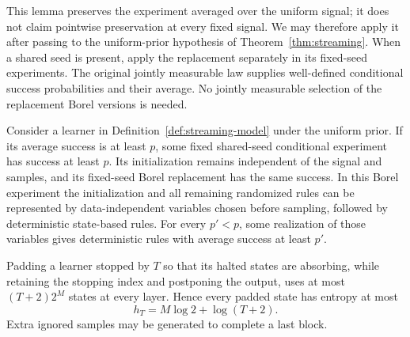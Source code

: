 This lemma preserves the experiment averaged over the uniform signal; it
does not claim pointwise preservation at every fixed signal. We may therefore
apply it after passing to the uniform-prior hypothesis of
Theorem~\ref{thm:streaming}.
When a shared seed is present, apply the replacement separately in its
fixed-seed experiments. The original jointly measurable law supplies
well-defined conditional success probabilities and their average. No
jointly measurable selection of the replacement Borel versions is needed.

\begin{lemma}\label{lem:padding}
Consider a learner in Definition~\ref{def:streaming-model} under the uniform
prior. If its average success is at least $p$, some fixed shared-seed
conditional experiment has success at least $p$. Its initialization remains
independent of the signal and samples, and its fixed-seed Borel replacement
has the same success. In this Borel experiment the initialization and all
remaining randomized rules can be represented by data-independent variables
chosen before sampling, followed by deterministic state-based rules. For
every $p'<p$, some realization of those variables gives deterministic rules
with average success at least $p'$.

Padding a learner stopped by $T$ so that its halted states are absorbing,
while retaining the stopping index and postponing the output, uses at most
$(T+2)2^M$ states at every layer. Hence every padded state has entropy at
most
\begin{equation}\label{eq:padded-entropy}
 h_T=M\log2+\log(T+2).
\end{equation}
Extra ignored samples may be generated to complete a last block.
\end{lemma}

